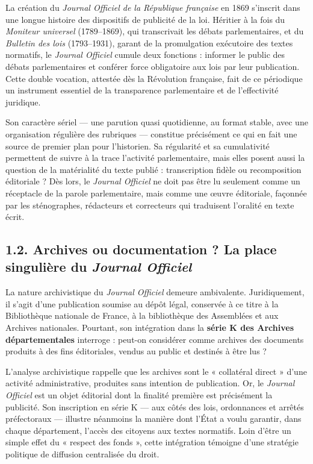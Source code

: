 La création du \emph{Journal Officiel de la République française} en 1869 s’inscrit dans une longue histoire des dispositifs de publicité de la loi. Héritier à la fois du \emph{Moniteur universel} (1789–1869), qui transcrivait les débats parlementaires, et du \emph{Bulletin des lois} (1793–1931), garant de la promulgation exécutoire des textes normatifs, le \emph{Journal Officiel} cumule deux fonctions : informer le public des débats parlementaires et conférer force obligatoire aux lois par leur publication. Cette double vocation, attestée dès la Révolution française, fait de ce périodique un instrument essentiel de la transparence parlementaire et de l’effectivité juridique.

Son caractère sériel — une parution quasi quotidienne, au format stable, avec une organisation régulière des rubriques — constitue précisément ce qui en fait une source de premier plan pour l’historien. Sa régularité et sa cumulativité permettent de suivre à la trace l’activité parlementaire, mais elles posent aussi la question de la matérialité du texte publié : transcription fidèle ou recomposition éditoriale ? Dès lors, le \emph{Journal Officiel} ne doit pas être lu seulement comme un réceptacle de la parole parlementaire, mais comme une œuvre éditoriale, façonnée par les sténographes, rédacteurs et correcteurs qui traduisent l’oralité en texte écrit.

\subsection{1.2. Archives ou documentation ? La place singulière du \emph{Journal Officiel}}

La nature archivistique du \emph{Journal Officiel} demeure ambivalente. Juridiquement, il s’agit d’une publication soumise au dépôt légal, conservée à ce titre à la Bibliothèque nationale de France, à la bibliothèque des Assemblées et aux Archives nationales. Pourtant, son intégration dans la \textbf{série K des Archives départementales} interroge : peut-on considérer comme archives des documents produits à des fins éditoriales, vendus au public et destinés à être lus ?

L’analyse archivistique rappelle que les archives sont le « collatéral direct » d’une activité administrative, produites sans intention de publication. Or, le \emph{Journal Officiel} est un objet éditorial dont la finalité première est précisément la publicité. Son inscription en série K — aux côtés des lois, ordonnances et arrêtés préfectoraux — illustre néanmoins la manière dont l’État a voulu garantir, dans chaque département, l’accès des citoyens aux textes normatifs. Loin d’être un simple effet du « respect des fonds », cette intégration témoigne d’une stratégie politique de diffusion centralisée du droit.

